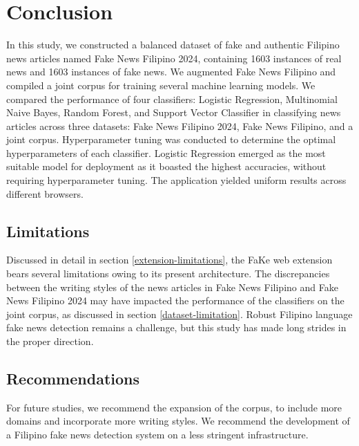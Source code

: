 \chapter{Conclusion}

In this study, we constructed a balanced dataset of fake and authentic Filipino news articles named Fake News Filipino 2024, containing 1603 instances of real news and 1603 instances of fake news. We augmented Fake News Filipino and compiled a joint corpus for training several machine learning models. We compared the performance of four classifiers: Logistic Regression, Multinomial Naive Bayes, Random Forest, and Support Vector Classifier in classifying news articles across three datasets: Fake News Filipino 2024, Fake News Filipino, and a joint corpus. Hyperparameter tuning was conducted to determine the optimal hyperparameters of each classifier. Logistic Regression emerged as the most suitable model for deployment as it boasted the highest accuracies, without requiring hyperparameter tuning. The application yielded uniform results across different browsers.

\section{Limitations}

Discussed in detail in section \ref{extension-limitations}, the FaKe web extension bears several limitations owing to its present architecture. The discrepancies between the writing styles of the news articles in Fake News Filipino and Fake News Filipino 2024 may have impacted the performance of the classifiers on the joint corpus, as discussed in section \ref{dataset-limitation}. Robust Filipino language fake news detection remains a challenge, but this study has made long strides in the proper direction.

\section{Recommendations}

For future studies, we recommend the expansion of the corpus, to include more domains and incorporate more writing styles. We recommend the development of a Filipino fake news detection system on a less stringent infrastructure. 